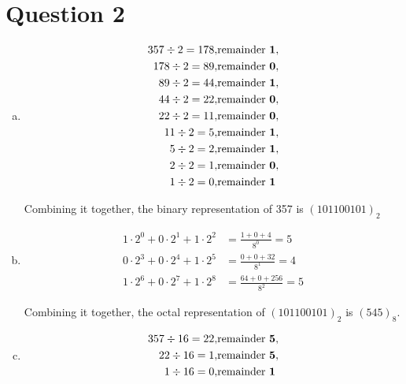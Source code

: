 \documentclass[12pt]{article}
\begin{document}
\section*{Question 2}
\begin{enumerate}[a.]
    \item
    \setcounter{equation}{0}
    \begin{align*}
        357 \div 2 = 178, &\text{remainder \textbf{1}},\\
        178 \div 2 = 89, &\text{remainder \textbf{0}},\\
        89 \div 2 = 44, &\text{remainder \textbf{1}},\\
        44 \div 2 = 22, &\text{remainder \textbf{0}},\\
        22 \div 2 = 11, &\text{remainder \textbf{0}},\\
        11 \div 2 = 5, &\text{remainder \textbf{1}},\\
        5 \div 2 = 2, &\text{remainder \textbf{1}},\\
        2 \div 2 = 1, &\text{remainder \textbf{0}},\\
        1 \div 2 = 0, &\text{remainder \textbf{1}}
    \end{align*}

    Combining it together, the binary representation of 357 is $(101100101)_2$

    \item

    \begin{align*}
        1 \cdot 2^0 + 0 \cdot 2^1 + 1 \cdot 2^2 &= \frac{1 + 0 + 4}{8^0} = 5\\
        0 \cdot 2^3 + 0 \cdot 2^4 + 1 \cdot 2^5 &= \frac{0 + 0 + 32}{8^1} = 4\\
        1 \cdot 2^6 + 0 \cdot 2^7 + 1 \cdot 2^8 &= \frac{64 + 0 + 256}{8^2} = 5
    \end{align*}

    Combining it together, the octal representation of $(101100101)_2$ is
    $(545)_8$.

    \item

    \begin{align*}
        357 \div 16 = 22, &\text{remainder \textbf{5}},\\
        22 \div 16 = 1, &\text{remainder \textbf{5}},\\
        1 \div 16 = 0, &\text{remainder \textbf{1}}
    \end{align*}


\end{enumerate}
\end{document}
